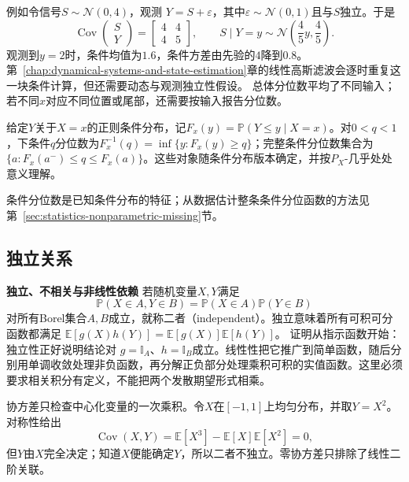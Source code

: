 例如令信号\(S\sim\mathcal{N}(0,4)\)，观测
\(Y=S+\varepsilon\)，其中\(\varepsilon\sim\mathcal{N}(0,1)\)且与\(S\)独立。于是
\[
  \operatorname{Cov}
  \begin{pmatrix}S\\Y\end{pmatrix}
  =
  \begin{bmatrix}4&4\\4&5\end{bmatrix},
  \qquad
  S\mid Y=y\sim\mathcal{N}\left(\frac45y,\frac45\right).
\]
观测到\(y=2\)时，条件均值为\(1.6\)，条件方差由先验的\(4\)降到\(0.8\)。第~\ref{chap:dynamical-systems-and-state-estimation}章的线性高斯滤波会逐时重复这一块条件计算，但还需要动态与观测独立性假设。
总体分位数平均了不同输入；若不同\(x\)对应不同位置或尾部，还需要按输入报告分位数。
\begin{definition}[条件分位数]
  \label{def:statistics-conditional-quantile}
给定\(Y\)关于\(X=x\)的正则条件分布，记\(F_x(y)=\mathbb P(Y\leq y\mid X=x)\)。对\(0<q<1\)，下条件\(q\)分位数为\(F_x^{-1}(q)=\inf\{y:F_x(y)\geq q\}\)；完整条件分位数集合为\(\{a:F_x(a^-)\leq q\leq F_x(a)\}\)。这些对象随条件分布版本确定，并按\(P_X\)-几乎处处意义理解。
\end{definition}
条件分位数是已知条件分布的特征；从数据估计整条条件分位函数的方法见第~\ref{sec:statistics-nonparametric-missing}节。

\subsection{独立关系}
\label{sec:probability-moments-independence}

\par\medskip\noindent\textbf{独立、不相关与非线性依赖}\quad
若随机变量\(X,Y\)满足
\[ \mathbb{P}(X\in A,Y\in B)
  =\mathbb{P}(X\in A)\mathbb{P}(Y\in B) \]
对所有Borel集合\(A,B\)成立，就称二者（independent）。独立意味着所有可积可分函数都满足
\(\mathbb{E}[g(X)h(Y)]=\mathbb{E}[g(X)]\mathbb{E}[h(Y)]\)。
证明从指示函数开始：独立性正好说明结论对
\(g=\mathbb{I}_A\)、\(h=\mathbb{I}_B\)成立。线性性把它推广到简单函数，随后分别用单调收敛处理非负函数，再分解正负部分处理乘积可积的实值函数。这里必须要求相关积分有定义，不能把两个发散期望形式相乘。

协方差只检查中心化变量的一次乘积。令\(X\)在\([-1,1]\)上均匀分布，并取\(Y=X^2\)。对称性给出
\[ \operatorname{Cov}(X,Y)
  =\mathbb{E}[X^3]-\mathbb{E}[X]\mathbb{E}[X^2]=0, \]
但\(Y\)由\(X\)完全决定；知道\(X\)便能确定\(Y\)，所以二者不独立。零协方差只排除了线性二阶关联。

